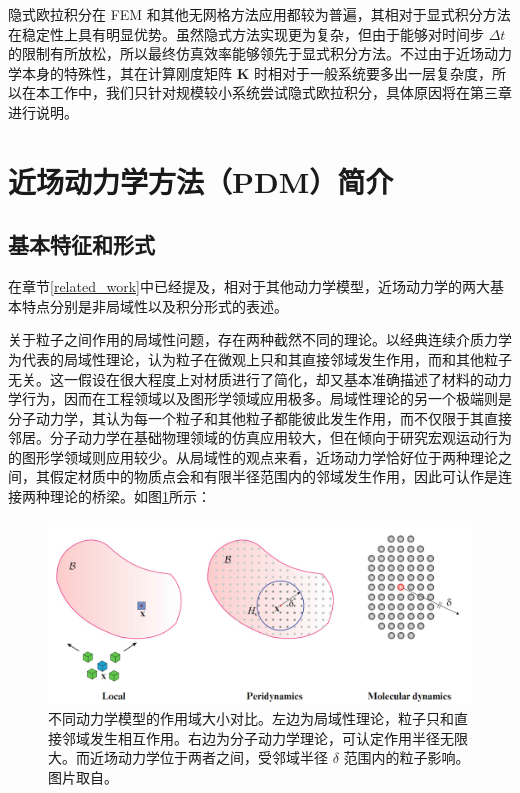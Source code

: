 隐式欧拉积分在 FEM 和其他无网格方法应用都较为普遍，其相对于显式积分方法在稳定性上具有明显优势。虽然隐式方法实现更为复杂，但由于能够对时间步 $\Delta t$ 的限制有所放松，所以最终仿真效率能够领先于显式积分方法。不过由于近场动力学本身的特殊性，其在计算刚度矩阵 $\textbf{K}$ 时相对于一般系统要多出一层复杂度，所以在本工作中，我们只针对规模较小系统尝试隐式欧拉积分，具体原因将在第三章进行说明。


\section{近场动力学方法（PDM）简介}

\subsection{基本特征和形式}
\label{pdm_basic_feature}
在章节\ref{related_work}中已经提及，相对于其他动力学模型，近场动力学的两大基本特点分别是非局域性以及积分形式的表述。

关于粒子之间作用的局域性问题，存在两种截然不同的理论。以经典连续介质力学为代表的局域性理论，认为粒子在微观上只和其直接邻域发生作用，而和其他粒子无关。这一假设在很大程度上对材质进行了简化，却又基本准确描述了材料的动力学行为，因而在工程领域以及图形学领域应用极多。局域性理论的另一个极端则是分子动力学，其认为每一个粒子和其他粒子都能彼此发生作用，而不仅限于其直接邻居。分子动力学在基础物理领域的仿真应用较大，但在倾向于研究宏观运动行为的图形学领域则应用较少。从局域性的观点来看，近场动力学恰好位于两种理论之间，其假定材质中的物质点会和有限半径范围内的邻域发生作用，因此可认作是连接两种理论的桥梁。如图\ref{peridynamics_comparison}所示：

\begin{figure}[htbp!]
  \centering
  \captionsetup{justification=centering}
  \includegraphics[width=\linewidth]{chap/image/peridynamics_comparison}

  \caption{\label{peridynamics_comparison}
           不同动力学模型的作用域大小对比。左边为局域性理论，粒子只和直接邻域发生相互作用。右边为分子动力学理论，可认定作用半径无限大。而近场动力学位于两者之间，受邻域半径 $\delta$ 范围内的粒子影响。图片取自。
          }
\end{figure}

